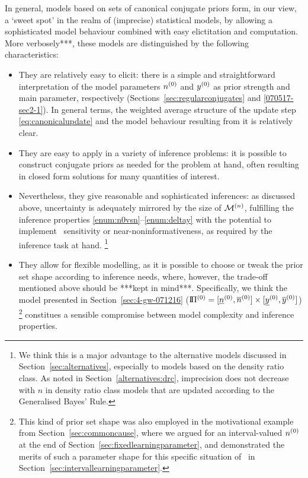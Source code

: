 In general, %
models based on sets of canonical conjugate priors form, in our view,
a `sweet spot' in the realm of (imprecise) statistical models,
by allowing a sophisticated model behaviour
combined with easy elictitation and computation.
More verbosely***,
these models are distinguished by the following characteristics:

\begin{itemize}
\item They are relatively easy to elicit:
there is a simple and straightforward interpretation of the model parameters $n^{(0)}$ and $y^{(0)}$
as prior strength and main parameter, respectively (Sections~\ref{sec:regularconjugates} and \ref{070517-sec2-1}).
In general terms, the weighted average structure of the update step \eqref{eq:canonicalupdate}
and the model behaviour resulting from it is relatively clear.
\item They are easy to apply in a variety of inference problems:
it is possible to construct conjugate priors as needed for the problem at hand,
often resulting in closed form solutions for many quantities of interest.
\item Nevertheless, they give reasonable and sophisticated inferences:
as discussed above, uncertainty is adequately mirrored by the size of $\mathcal{M}^{(n)}$,
fulfilling the inference properties \ref{enum:n0vsn}--\ref{enum:deltay}
with the potential to implement \pdc\ sensitivity or near-noninformativeness,
as required by the inference task at hand.%
\footnote{We think this is a major advantage to the alternative models
discussed in Section~\ref{sec:alternatives},
especially to models based on the density ratio class.
As noted in Section~\ref{alternatives:drc}, imprecision does not decrease with $n$ in
density ratio class models that are updated according to the Generalised Bayes' Rule.}
\item They allow for flexible modelling, as
it is possible to choose or tweak the prior set shape according to inference needs,
where, however, the trade-off mentioned above should be ***kept in mind***.
Specifically, we think the model presented in Section~\ref{sec:4-gw-071216}
($\text{I}\!\Pi^{(0)} = [\underline{n}^{(0)}, \overline{n}^{(0)}] \times [\underline{y}^{(0)}, \overline{y}^{(0)}]$)%
\footnote{This kind of prior set shape was also employed in the motivational example
from Section~\ref{sec:commoncause}, where we argued for an interval-valued $n^{(0)}$
at the end of Section~\ref{sec:fixedlearningparameter},
and demonstrated the merits of such a parameter shape for this specific situation of \pdc\
in Section~\ref{sec:intervallearningparameter}.}
constitues a sensible compromise between model complexity and inference properties.
\end{itemize}

